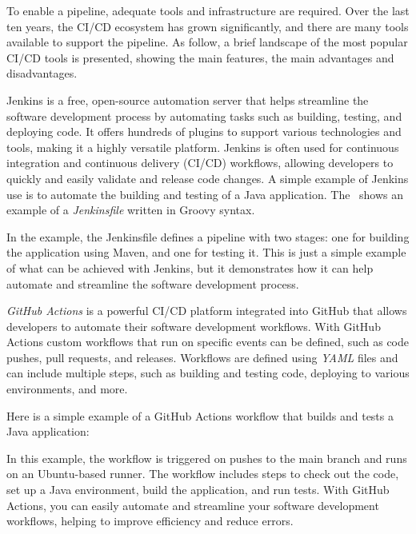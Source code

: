To enable a pipeline, adequate tools and infrastructure are required. Over the last ten years, the CI/CD ecosystem has grown significantly,
and there are many tools available to support the pipeline.
As follow, a brief landscape of the most popular CI/CD tools is presented, showing the main features, the main advantages and disadvantages.


Jenkins is a free, open-source automation server that helps streamline the software development process by automating tasks such as building,
testing, and deploying code. It offers hundreds of plugins to support various technologies and tools, making it a highly versatile platform. Jenkins
is often used for continuous integration and continuous delivery (CI/CD) workflows, allowing developers to quickly and easily validate and release
code changes. A simple example of Jenkins use is to automate the building and testing of a Java application. The~ shows an example of a \emph{Jenkinsfile} written in Groovy syntax.



In the example, the Jenkinsfile defines a pipeline with two stages: one for building the application using Maven, and one for testing it. This is
just a simple example of what can be achieved with Jenkins, but it demonstrates how it can help automate and streamline the software development
process.

\emph{GitHub Actions} is a powerful CI/CD platform integrated into GitHub that allows developers to automate their software development workflows.
With GitHub Actions custom workflows that run on specific events can be defined, such as code pushes, pull requests, and releases. Workflows are
defined using \emph{YAML} files and can include multiple steps, such as building and testing code, deploying to various environments, and more.

Here is a simple example of a GitHub Actions workflow that builds and tests a Java application:



In this example, the workflow is triggered on pushes to the main branch and runs on an Ubuntu-based runner. The workflow includes steps to
check out the code, set up a Java environment, build the application, and run tests. With GitHub Actions, you can easily
automate and streamline your software development workflows, helping to improve efficiency and reduce errors.

